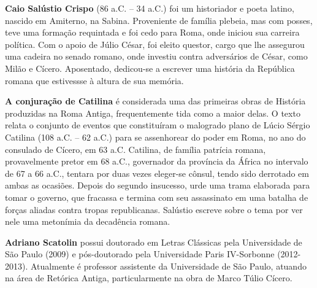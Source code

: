 \textbf{Caio Salústio Crispo} (86 a.C. -- 34 a.C.) foi um historiador e poeta latino, nascido em Amiterno, na Sabina. Proveniente de família plebeia, mas com posses, teve uma formação requintada e foi cedo para Roma, onde iniciou sua carreira política. Com o apoio de Júlio César, foi eleito questor, cargo que lhe assegurou uma cadeira no senado romano, onde investiu contra adversários de César, como Milão e Cícero. Aposentado, dedicou-se a escrever uma história da República romana que estivessse à altura de sua memória.


\textbf{A conjuração de Catilina} é considerada uma das primeiras obras de História produzidas na Roma Antiga, frequentemente tida como a maior delas. O texto relata o conjunto de eventos que constituíram o malogrado plano de Lúcio Sérgio Catilina (108 a.C. -- 62 a.C.) para se assenhorear do poder em Roma, no ano do consulado de Cícero, em 63 a.C. Catilina, de família patrícia romana, provavelmente pretor em 68 a.C., governador da província da África no intervalo de 67 a 66 a.C., tentara por duas vezes eleger-se cônsul, tendo sido derrotado em ambas as ocasiões. Depois do segundo insucesso, urde uma trama elaborada para tomar o governo, que fracassa e termina com seu assassinato em uma batalha de forças aliadas contra tropas republicanas. Salústio escreve sobre o tema por ver nele uma metonímia da decadência romana.


\textbf{Adriano Scatolin} possui doutorado em Letras Clássicas pela Universidade de São Paulo (2009) e pós-doutorado pela Universidade Paris IV-Sorbonne (2012-2013). Atualmente é professor assistente da Universidade de São Paulo, atuando na área de Retórica Antiga, particularmente na obra de Marco Túlio Cícero.\par
